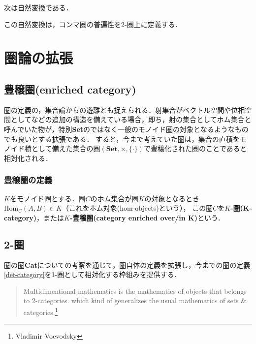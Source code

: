 \documentclass[uplatex, 12pt, dvipdfmx]{jsreport}
\begin{document}
\begin{proposition}
    次は自然変換である．
    \begin{center}\end{center}
\end{proposition}

この自然変換は，コンマ圏の普遍性を2-圏上に定義する．
\begin{definition}[コンマ圏の普遍性]
    
\end{definition}

\part{圏論の拡張}

\chapter{豊穣圏(enriched category)}
圏の定義の，集合論からの遊離とも捉えられる．射集合がベクトル空間や位相空間としてなどの追加の構造を備えている場合，即ち，射の集合としてホム集合と呼んでいた物が，特別\textbf{Set}のではなく一般のモノイド圏の対象となるようなものでも良いとする拡張である．
すると，今まで考えていた圏は，集合の直積をモノイド積として備えた集合の圏$(\mathbf{Set},\times,\{\cdot\} )$で豊穣化された圏のことであると相対化される．

\section{豊穣圏の定義}
\begin{definition}\rm{}
    $K$をモノイド圏とする．圏$C$のホム集合が圏$K$の対象となるとき$\mathrm{Hom}_C(A,B)\in K$（これをホム対象(hom-objects)という），
    この圏$C$を\textbf{$K$-圏(K-category)}，または\textbf{$K$-豊穣圏(category enriched over/in K)}という．
\end{definition}

\chapter{2-圏}
圏の圏\textbf{Cat}についての考察を通じて，圏自体の定義を拡張し，今までの圏の定義\ref{def-category}を1-圏として相対化する枠組みを提供する．
\begin{quotation}
    Multidimentional mathematics is the mathematics of objects that belongs to 2-categories. which kind of generalizes the usual mathematics of sets & categories.\footnote{Vladimir Voevodsky}
\end{quotation}
\end{document}
